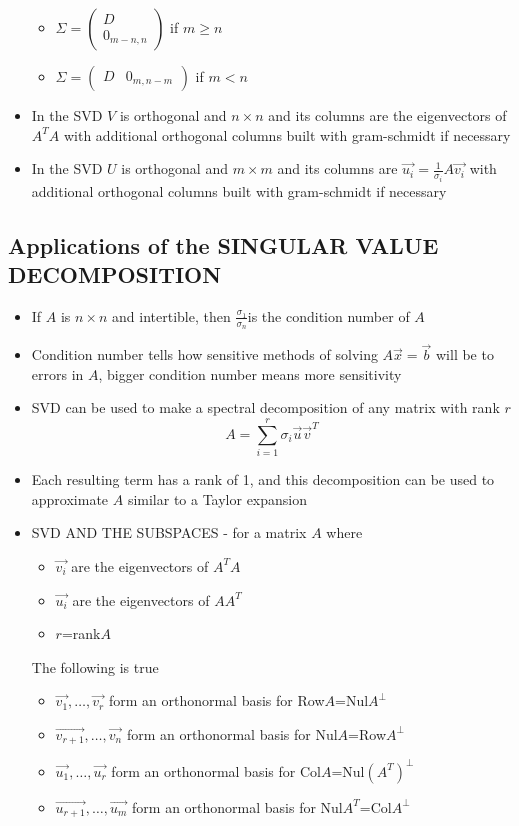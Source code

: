 \documentclass{article}
\begin{document}
\begin{itemize}
\begin{itemize}
        \item \(\Sigma=\begin{pmatrix} D \\ 0_{m-n,n} \end{pmatrix}\) if \(m\geq n\)
        \item \(\Sigma=\begin{pmatrix} D & 0_{m,n-m} \end{pmatrix}\) if \(m<n\)
    \end{itemize}
    \item In the SVD \(V\) is orthogonal and \(n \times n\) and its columns are the eigenvectors of \(A^TA\) with additional orthogonal columns built with gram-schmidt if necessary
    \item In the SVD \(U\) is orthogonal and \(m \times m\) and its columns are \(\vec{u_i}=\frac{1}{\sigma_i}A\vec{v_i}\) with additional orthogonal columns built with gram-schmidt if necessary
\end{itemize}

\subsection{Applications of the SINGULAR VALUE DECOMPOSITION}
\begin{itemize}
    \item If \(A\) is \(n \times n\) and intertible, then \(\frac{\sigma_1}{\sigma_n}\)is the condition number of \(A\)
    \item Condition number tells how sensitive methods of solving \(A\vec{x}=\vec{b}\) will be to errors in \(A\), bigger condition number means more sensitivity
    \item SVD can be used to make a spectral decomposition of any matrix with rank \(r\) \[A=\sum_{i=1}^r \sigma_i\vec{u}\vec{v}^T\]
    \item Each resulting term has a rank of 1, and this decomposition can be used to approximate \(A\) similar to a Taylor expansion 
    \item SVD AND THE SUBSPACES - for a matrix \(A\) where 
    \begin{itemize}
        \item \(\vec{v_i}\) are the eigenvectors of \(A^TA\)
        \item \(\vec{u_i}\) are the eigenvectors of \(AA^T\)
        \item \(r\)=rank\(A\)
    \end{itemize}
    The following is true
    \begin{itemize}
        \item \(\vec{v_1},\dots,\vec{v_r}\) form an orthonormal basis for Row\(A\)=Nul\(A^{\perp}\)
        \item \(\vec{v_{r+1}},\dots,\vec{v_n}\) form an orthonormal basis for Nul\(A\)=Row\(A^{\perp}\)
        \item \(\vec{u_1},\dots,\vec{u_r}\) form an orthonormal basis for Col\(A\)=Nul\((A^T)^{\perp}\)
        \item \(\vec{u_{r+1}},\dots,\vec{u_m}\) form an orthonormal basis for Nul\(A^T\)=Col\(A^{\perp}\)
    \end{itemize}
\end{itemize}
\end{document}
